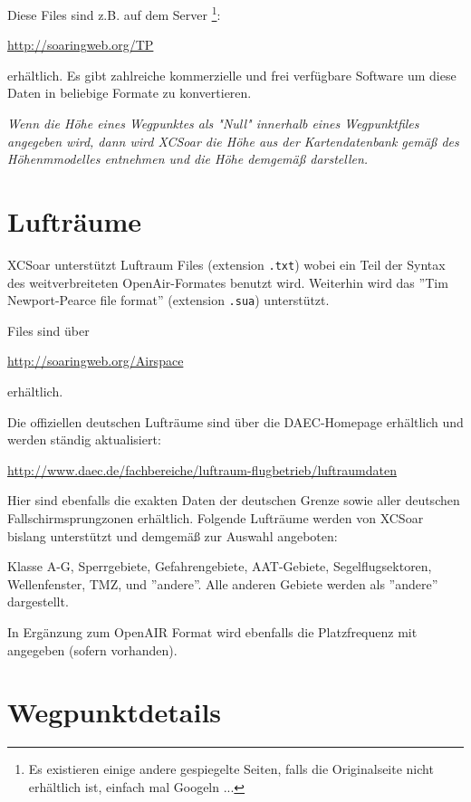 Diese Files sind z.B. auf dem Server \footnote{Es existieren einige andere gespiegelte Seiten, falls die
Originalseite nicht erhältlich ist, einfach mal Googeln ...}:
\begin{center}
\url{http://soaringweb.org/TP}
\end{center}
erhältlich. Es gibt zahlreiche kommerzielle und frei verfügbare Software um diese Daten in beliebige Formate zu
konvertieren.

\achtung \textsl{Wenn die Höhe eines Wegpunktes als "Null" innerhalb eines Wegpunktfiles angegeben
wird, dann wird \textsf{XCSoar} die Höhe aus der Kartendatenbank gemäß des Höhenmmodelles entnehmen und die
Höhe demgemäß darstellen.}


\section{Lufträume}

\textsf{XCSoar} unterstützt Luftraum Files (extension \verb|.txt|) wobei ein Teil der Syntax
des weitverbreiteten OpenAir-Formates benutzt wird. Weiterhin wird das ''Tim Newport-Pearce file format''
(extension \verb|.sua|) unterstützt.

Files sind über
\begin{center}
\url{http://soaringweb.org/Airspace}
\end{center}
 erhältlich.

Die offiziellen deutschen Lufträume sind über die DAEC-Homepage erhältlich und werden ständig
aktualisiert:
\begin{center}
\url{http://www.daec.de/fachbereiche/luftraum-flugbetrieb/luftraumdaten}
\end{center}

Hier sind ebenfalls die exakten Daten der deutschen Grenze sowie aller deutschen Fallschirmsprungzonen
erhältlich. Folgende Lufträume werden von \textsf{XCSoar} bislang unterstützt und demgemäß zur Auswahl angeboten:

Klasse A-G, Sperrgebiete, Gefahrengebiete, AAT-Gebiete, Segelflugsektoren, Wellenfenster, TMZ, und
''andere''.  Alle anderen Gebiete werden als ''andere'' dargestellt.

In Ergänzung zum OpenAIR Format wird ebenfalls die Platzfrequenz mit angegeben (sofern vorhanden).
%
%
%
%
%
%
%
%
%

\section{Wegpunktdetails}\label{sec:airfield-details}

